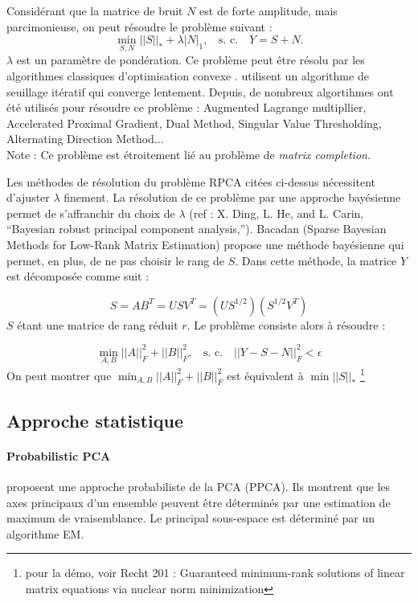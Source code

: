 Considérant que la matrice de bruit $N$  est de forte amplitude, mais parcimonieuse, on peut résoudre le problème suivant \citep{Wright2009a} : 
\begin{equation}
    \min_{S,N} ||S||_* + \lambda|N|_1,~~~~\text{s. c.~~~}Y=S+N.
\end{equation}
$\lambda$ est un paramètre de pondération.
Ce problème peut être résolu par les algorithmes classiques d'optimisation convexe .
 \cite{Wright2009a} utilisent un algorithme de seuillage itératif qui converge lentement. Depuis, de nombreux algortihmes ont été utilisés pour résoudre ce problème :  Augmented Lagrange multipllier,  Accelerated Proximal Gradient,  Dual Method, Singular Value Thresholding, Alternating Direction Method...\\
 
 Note : Ce problème est étroitement lié au problème de \textit{matrix completion}.	

Les méthodes de résolution du problème RPCA citées ci-dessus nécessitent d'ajuster $\lambda$  finement. La résolution de ce problème par une approche bayésienne permet de s'affranchir du choix de $\lambda$ (ref : X. Ding, L. He, and L. Carin, “Bayesian robust principal component  analysis,”). Bacadan (Sparse Bayesian Methods for Low-Rank Matrix Estimation) propose une méthode bayésienne qui permet, en plus, de ne pas choisir le rang de $S$. Dans cette méthode, la matrice $Y$ est décomposée comme suit : 

\begin{equation}
    S=AB^T = USV^T = \left(  US^{1/2} \right) \left(  S^{1/2}V^T \right)
\end{equation}
$S$ étant une matrice de rang réduit $r$. Le problème consiste alors à résoudre : 

\begin{equation}
    \min_{A,B} ||A||_{F}^{2}  + ||B||_{F}^{2},~~~~\text{s. c.~~~} ||Y-S-N||^2_{F} < \epsilon
\end{equation}
On peut montrer que  $\min_{A,B} ||A||_{F}^{2}  + ||B||_{F}^{2}$ est équivalent à $\min ||S||_*$ \footnote{pour la démo, voir Recht 201 : Guaranteed minimum-rank solutions of linear matrix equations via nuclear norm minimization}



\subsection{Approche statistique}

\paragraph{\tbullet Probabilistic PCA}
\cite{Tipping1999} proposent une approche probabiliste de la PCA (PPCA). Ils montrent que les axes principaux d'un ensemble peuvent être déterminés par une estimation de maximum de vraisemblance. Le principal sous-espace est déterminé par un algorithme EM.

